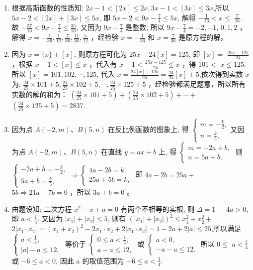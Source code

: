 \documentclass[10pt]{article}
\begin{document}
\begin{enumerate}
  \item 根据高斯函数的性质知: $2 x-1<[2 x] \leqslant 2 x, 3 x-1<[3 x] \leqslant 3 x$,所以 $5 x-2<[2 x]+[3 x] \leqslant 5 x$, 即 $5 x-2<9 x-\frac{7}{4} \leqslant 5 x$, 解得 $-\frac{1}{16}<x \leqslant$ $\frac{7}{16}$. 故 $-\frac{37}{16}<9 x-\frac{7}{4} \leqslant \frac{35}{16}$, 又因为 $9 x-\frac{7}{4}$ 是整数, 所以 $9 x-\frac{7}{4}=-2,-1$, $0,1,2$ ，解得 $x=-\frac{1}{36}, \frac{1}{12}, \frac{7}{36}, \frac{11}{36}, \frac{5}{12}$ ，经检验 $x=-\frac{1}{36}$ 和 $x=\frac{7}{36}$ 是原方程的解。
  \item 因为 $x=\{x\}+[x]$, 则原方程可化为 $25 x-24[x]=125$, 即 $[x]=$ $\frac{25 x-125}{24}$ ，根据 $x-1<[x] \leqslant x$ ，代入有 $x-1<\frac{25 x-125}{24} \leqslant x$ ，得 $101<$ $x \leqslant 125$. 所以 $[x]=101,102, \cdots, 125$, 代入 $x=\frac{24[x]+125}{25}=\frac{24}{25}[x]+5$,依次得到实数 $x$ 为: $\frac{24}{25} \times 101+5, \frac{24}{25} \times 102+5, \cdots, \frac{24}{25} \times 125+5$ ，经检验都满足题意，所以所有实数的解的和为： $\left(\frac{24}{25} \times 101+5\right)+\left(\frac{24}{25} \times 102+5\right)+\cdots+$ $\left(\frac{24}{25} \times 125+5\right)=2837$.
  \item 因为点 $A(-2, m) 、 B(5, n)$ 在反比例函数的图象上, 得 $\left\{\begin{array}{l}m=-\frac{k}{2}, \\ n=\frac{k}{5},\end{array}\right.$又因为点 $A(-2, m) 、 B(5, n)$ 在直线 $y=a x+b$ 上, 得 $\left\{\begin{array}{l}m=-2 a+b, \\ n=5 a+b,\end{array}\right.$ 则 $\left\{\begin{array}{l}-2 a+b=-\frac{k}{2}, \\ 5 a+b=\frac{k}{5},\end{array} \Rightarrow\left\{\begin{array}{l}4 a-2 b=k, \\ 25 a+5 b=k,\end{array}\right.\right.$ 即 $4 a-2 b=25 a+$ $5 b \Rightarrow 21 a+7 b=0$ ，所以 $3 a+b=0$ 。
  \item 由题设知: 二次方程 $x^{2}-x+a=0$ 有两个不相等的实根, 则 $\Delta=1-$ $4 a>0$, 即 $a<\frac{1}{4}$. 又因为 $\left|x_{1}\right|+\left|x_{2}\right| \leqslant 5$, 则有 $\left(\left|x_{1}\right|+\left|x_{2}\right|\right)^{2} \leqslant x_{1}^{2}+x_{2}^{2}+$ $2\left|x_{1} \cdot x_{2}\right|=\left(x_{1}+x_{2}\right)^{2}-2 x_{1} \cdot x_{2}+2\left|x_{1} \cdot x_{2}\right|=1-2 a+2|a| \leqslant 25$,所以满足 $\left\{\begin{array}{l}a<\frac{1}{4}, \\ |a|-a \leqslant 12,\end{array}\right.$ 等价于 $\left\{\begin{array}{l}0 \leqslant a<\frac{1}{4}, \\ a-a \leqslant 12,\end{array}\right.$ 或 $\left\{\begin{array}{l}a<0, \\ -a-a \leqslant 12 .\end{array}\right.$ 所以 $0 \leqslant$ $a<\frac{1}{4}$ 或 $-6 \leqslant a<0$, 因此 $a$ 的取值范围为 $-6 \leqslant a<\frac{1}{4}$.

\end{enumerate}
\end{document}
